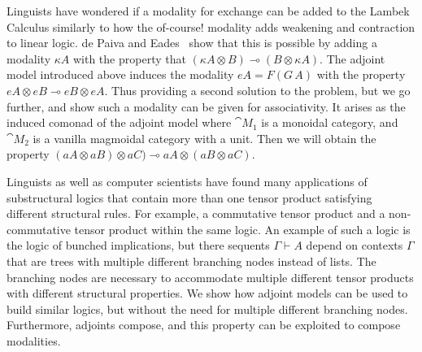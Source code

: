 Linguists have wondered if a modality for exchange can be added to the
Lambek Calculus similarly to how the of-course! modality adds
weakening and contraction to linear logic.  de Paiva and
Eades~\cite{?} show that this is possible by adding a modality $\kappa
A$ with the property that $(\kappa A \otimes B) \multimap (B \otimes
\kappa A)$.  The adjoint model introduced above induces the modality
$eA = F(G\,A)$ with the property $eA \otimes eB \multimap eB \otimes
eA$.  Thus providing a second solution to the problem, but we go
further, and show such a modality can be given for associativity. It
arises as the induced comonad of the adjoint model where $\cat{M}_1$
is a monoidal category, and $\cat{M}_2$ is a vanilla magmoidal
category with a unit.  Then we will obtain the property $(aA \otimes
aB) \otimes aC) \multimap aA \otimes (aB \otimes aC)$.

Linguists as well as computer scientists have found many applications
of substructural logics that contain more than one tensor product
satisfying different structural rules.  For example, a commutative
tensor product and a non-commutative tensor product within the same
logic.  An example of such a logic is the logic of bunched
implications, but there sequents $\Gamma \vdash A$ depend on contexts
$\Gamma$ that are trees with multiple different branching nodes
instead of lists.  The branching nodes are necessary to accommodate
multiple different tensor products with different structural
properties.  We show how adjoint models can be used to build similar
logics, but without the need for multiple different branching nodes.
Furthermore, adjoints compose, and this property can be exploited to
compose modalities.



